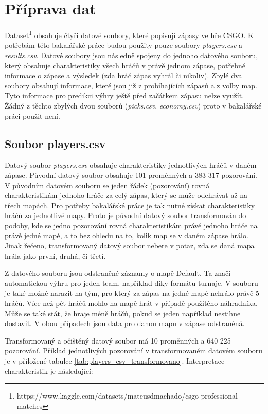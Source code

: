\section{Příprava dat}
Dataset\footnote{https://www.kaggle.com/datasets/mateusdmachado/csgo-professional-matches} obsahuje čtyři datové soubory, které popisují zápasy ve hře
\ac{CSGO}. K potřebám této bakalářské práce budou použity pouze soubory \textit{players.csv} a \textit{results.csv}. Datové soubory jsou následně spojeny do jednoho datového souboru,
který obsahuje charakteristiky všech hráčů v právě jednom zápase, potřebné informace o zápase a výsledek (zda hráč zápas vyhrál či nikoliv). Zbylé dva soubory obsahují
informace, které jsou již z probíhajících zápasů a z volby map. Tyto informace pro predikci výhry ještě před začátkem zápasu nelze využít. Žádný z těchto
zbylých dvou souborů (\textit{picks.csv}, \textit{economy.csv}) proto v bakalářské práci použit není.

\subsection{Soubor players.csv}
Datový soubor \textit{players.csv} obsahuje charakteristiky jednotlivých hráčů v daném zápase. Původní datový soubor obsahuje 101 proměnných a 383 317 pozorování.
V původním datovém souboru se jeden řádek (pozorování) rovná charakteristikám jednoho hráče za celý zápas, který se může odehrávat až na třech mapách.
Pro potřeby bakalářské práce je tak nutné získat charakteristiky hráčů za jednotlivé mapy. Proto je původní datový soubor transformován do podoby, kde se
jedno pozorování rovná charakteristikám právě jednoho hráče na právě jedné mapě, a to bez ohledu na to, kolik map se v daném zápase hrálo. Jinak řečeno, transformovaný
datový soubor nebere v potaz, zda se daná mapa hrála jako první, druhá, či třetí.

Z datového souboru jsou odstraněné záznamy o mapě Default. Ta značí automatickou výhru pro jeden team, například díky formátu turnaje. V souboru je také možné narazit na tým,
pro který za zápas na jedné mapě nehrálo právě 5 hráčů. Více než pět hráčů mohlo na mapě hrát v případě použitého náhradníka. 
Může se také stát, že hraje méně hráčů, pokud se jeden například nestihne dostavit. V obou případech jsou data pro danou mapu v zápase odstraněná.

\newpage
Transformovaný a očištěný datový soubor má 10 proměnných a 640 225 pozorování. Příklad jednotlivých pozorování v transformovaném datovém souboru je v
přiložené tabulce \ref{tab:players_csv_transformovano}. Interpretace charakteristik je následující:

